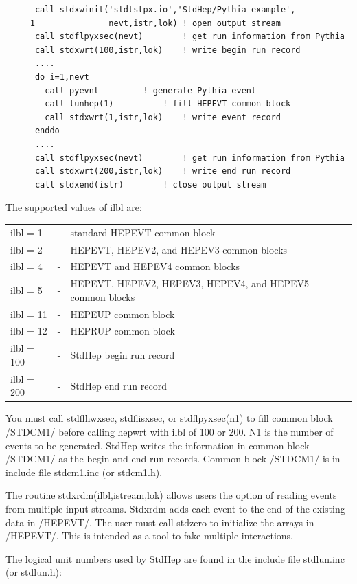\begin{verbatim}
      call stdxwinit('stdtstpx.io','StdHep/Pythia example',
     1               nevt,istr,lok)	! open output stream
      call stdflpyxsec(nevt)		! get run information from Pythia
      call stdxwrt(100,istr,lok)	! write begin run record
      ....
      do i=1,nevt
        call pyevnt			! generate Pythia event
        call lunhep(1)			! fill HEPEVT common block
        call stdxwrt(1,istr,lok)	! write event record
      enddo
      ....
      call stdflpyxsec(nevt)		! get run information from Pythia
      call stdxwrt(200,istr,lok)	! write end run record
      call stdxend(istr)		! close output stream
\end{verbatim}

\noindent The supported values of ilbl are:

\begin{center}
\begin{tabular}{lcll}
ilbl = 1   &-& standard HEPEVT common block \\
ilbl = 2   &-& HEPEVT, HEPEV2, and HEPEV3 common blocks \\
ilbl = 4   &-& HEPEVT and HEPEV4 common blocks \\
ilbl = 5   &-& HEPEVT, HEPEV2, HEPEV3, HEPEV4, and HEPEV5 common blocks \\
ilbl = 11  &-& HEPEUP common block \\
ilbl = 12  &-& HEPRUP common block \\
ilbl = 100 &-& StdHep begin run record \\
ilbl = 200 &-& StdHep end run record \\
\end{tabular}
\end{center}

You must call stdflhwxsec, stdflisxsec, or stdflpyxsec(n1) to fill
common block /STDCM1/ before calling hepwrt with ilbl of 100 or 200.
N1 is the number of events to be generated.
StdHep writes the information in common block /STDCM1/ as the begin and
end run records.  Common block /STDCM1/ is in include file stdcm1.inc
(or stdcm1.h).

The routine stdxrdm(ilbl,istream,lok) allows users the option
of reading events from multiple input streams.
Stdxrdm adds each event to the end of the existing data in /HEPEVT/.
The user must call stdzero to initialize the arrays in /HEPEVT/.
This is intended as a tool to fake multiple interactions.

The logical unit numbers used by StdHep are found in the include file
stdlun.inc (or stdlun.h):

